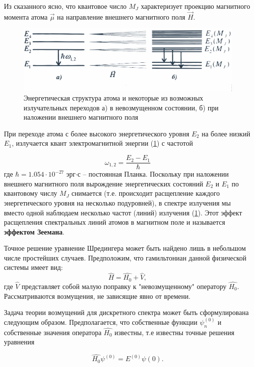 Из сказанного ясно, что квантовое число $M_J$ характеризует проекцию магнитного момента атома $\vec{\mu}$ на направление внешнего магнитного поля $\vec{H}$.

\begin{figure}[tb]
	\centering
	\includegraphics[width=\linewidth]{fig/fig1}
	\caption{Энергетическая структура атома и некоторые из возможных излучательных переходов
	а) в невозмущенном состоянии, б) при наложении внешнего магнитного поля}
	\label{fig:1}
\end{figure}

При переходе атома с более высокого энергетического уровня $E_2$ на более низкий $E_1$, излучается квант электромагнитной энергии (\ref{fig:1}) с частотой

\begin{equation}
\omega_{1,2}=\frac{E_2-E_1}{\hbar}
\label{eq:3}
\end{equation}
где $\hbar = 1.054\cdot10^{-27}$ эрг$\cdot$с -- постоянная Планка. Поскольку при наложении внешнего магнитного поля вырождение энергетических состояний $E_2$ и $E_1$ по квантовому числу $M_J$ снимается (т.е. происходит расщепление каждого энергетического уровня на несколько подуровней), в спектре излучения мы вместо одной наблюдаем несколько частот (линий) излучения (\ref{fig:1}). Этот эффект расщепления спектральных линий атомов в магнитном поле и называется \textbf{эффектом Зеемана}.

Точное решение уравнение Шредингера может быть найдено лишь в небольшом числе простейших случаев. Предположим, что гамильтониан данной физической системы имеет вид:
$$\widehat{H}=\widehat{H_0}+\widehat{V},$$
где $\widehat{V}$ представляет собой малую поправку к "невозмущенному" оператору $\widehat{H_0}$. Рассматриваются возмущения, не зависящие явно от времени.

Задача теории возмущений для дискретного спектра может быть сформулирована следующим образом. Предполагается, что собственные функции $\psi_n^{(0)}$ и собственные значения оператора $\widehat{H_0}$ известны, т.е известны точные решения уравнения

$$\widehat{H_0}\psi^{(0)}=E^{(0)}\psi{(0)}.$$

